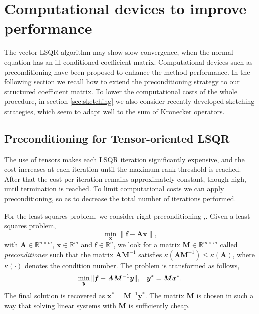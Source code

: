 \documentclass{siamart190516}
\newcommand{\bb}[1]{\mathbb{#1}}
\newcommand{\bx}{\bm x}
\newcommand{\by}{\bm y}
\newcommand{\bA}{\bm A}
\begin{document}
\section{Computational devices to improve performance}\label{sec:speed}
The vector LSQR algorithm may show slow convergence, when the normal equation has an ill-conditioned
coefficient matrix. Computational devices such as preconditioning
have been proposed to enhance the method performance.
In the following section we recall how to extend the preconditioning strategy to our
structured coefficient matrix. 
To lower the computational costs of the whole procedure, in section \ref{sec:sketching}
we also consider recently
developed sketching strategies, which seem to adapt well to the sum of Kronecker operators.

\subsection{Preconditioning for Tensor-oriented LSQR}\label{sec:precond}
The use of tensors makes each LSQR iteration significantly expensive, and the cost increases at each iteration until the maximum rank threshold is reached. After that
the cost per iteration remains approximately constant, though 
high, until termination is reached.
To limit computational costs we can apply 
preconditioning, so as to decrease the total number of iterations performed.

For the least squares problem, we consider right preconditioning \cite{BenziTumaPrec},\cite{HowellLsqrPrec}. Given a least squares problem, 
\[
\min_{\bx} \| {\bm f} - \bA\bx\|,
\]
with $\bA\in\bb{R}^{n\times m}$, $\bx\in\bb{R}^{m}$ and ${\bm f}\in\bb{R}^n$, we look for a matrix ${\bm M}\in\bb{R}^{m\times m}$ called \textit{preconditioner} such that the matrix $\bA{\bm M}^{-1}$ satisfies $\kappa(\bA {\bm M}^{-1}) \le \kappa(\bA)$, where $\kappa(\cdot)$ denotes the condition number. 
The problem is transformed as follows,
\[
\min_{\by} \| {\bm f} - \bA{\bm M}^{-1}\by \|, \hspace{.3cm} \by^* = {\bm M} \bx^*.
\]
The final solution is recovered as
$\bx^* = {\bm M}^{-1}\by^*$.
The matrix ${\bm M}$ is chosen in such a way that solving linear systems with ${\bm M}$ is sufficiently cheap.
\end{document}
